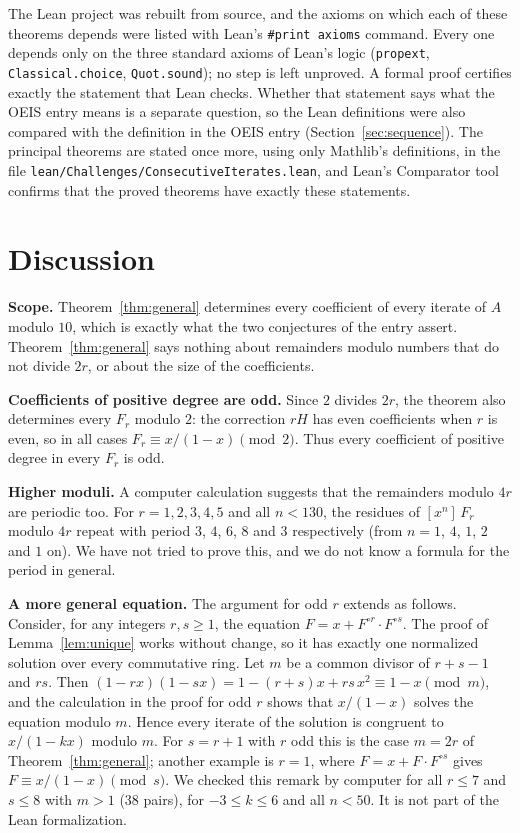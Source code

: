 \documentclass[11pt,a4paper]{article}
\theoremstyle{definition}
\theoremstyle{remark}
\newcommand{\coeff}[2]{[x^{#1}]\,#2}
\newcommand{\para}[1]{\par\medskip\noindent\textbf{#1}\enspace}
\begin{document}
The Lean project was rebuilt from source, and the axioms on which each of these theorems depends were listed with
Lean's \texttt{\#print axioms} command. Every one depends only on the three standard axioms of Lean's logic
(\texttt{propext}, \texttt{Classical.choice}, \texttt{Quot.sound}); no step is left unproved. A formal proof certifies
exactly the statement that Lean checks. Whether that statement says what the OEIS entry means is a separate question,
so the Lean definitions were also compared with the definition in the OEIS entry
(Section~\ref{sec:sequence}). The principal theorems are stated once more, using only Mathlib's definitions, in the
file \texttt{lean/Challenges/ConsecutiveIterates.lean}, and Lean's Comparator tool confirms that the
proved theorems have exactly these statements.

\section{Discussion}\label{sec:discussion}

\para{Scope.} Theorem~\ref{thm:general} determines every coefficient of every iterate of $A$ modulo $10$, which is
exactly what the two conjectures of the entry assert. Theorem~\ref{thm:general} says nothing about remainders modulo numbers that do
not divide $2r$, or about the size of the coefficients.

\para{Coefficients of positive degree are odd.} Since $2$ divides $2r$, the theorem also determines every $F_r$ modulo $2$: the
correction $rH$ has even coefficients when $r$ is even, so in all cases $F_r\equiv x/(1-x)\pmod2$. Thus every
coefficient of positive degree in every $F_r$ is odd.

\para{Higher moduli.} A computer calculation suggests that the remainders modulo $4r$ are periodic too. For $r=1,2,3,4,5$
and all $n<130$, the residues of $\coeff{n}{F_r}$ modulo $4r$ repeat with period $3$, $4$, $6$, $8$ and $3$
respectively (from $n=1$, $4$, $1$, $2$ and $1$ on). We have not tried to prove this, and we do not know a formula for
the period in general.

\para{A more general equation.} The argument for odd $r$ extends as follows. Consider, for any integers $r,s\ge1$, the
equation $F=x+F^{\circ r}\cdot F^{\circ s}$. The proof of Lemma~\ref{lem:unique} works without change, so it has exactly
one normalized solution over every commutative ring. Let $m$ be a common divisor of $r+s-1$ and $rs$. Then
$(1-rx)(1-sx)=1-(r+s)x+rs\,x^2\equiv1-x\pmod m$, and the calculation in the proof for odd $r$ shows that
$x/(1-x)$ solves the equation modulo $m$. Hence every iterate of the solution is congruent to $x/(1-kx)$ modulo $m$.
For $s=r+1$ with $r$ odd this is the case $m=2r$ of Theorem~\ref{thm:general}; another example is $r=1$, where
$F=x+F\cdot F^{\circ s}$ gives $F\equiv x/(1-x)\pmod s$. We checked this remark by computer for all $r\le7$ and
$s\le8$ with $m>1$ ($38$ pairs), for $-3\le k\le6$ and all $n<50$. It is not part of the Lean formalization.
\end{document}
